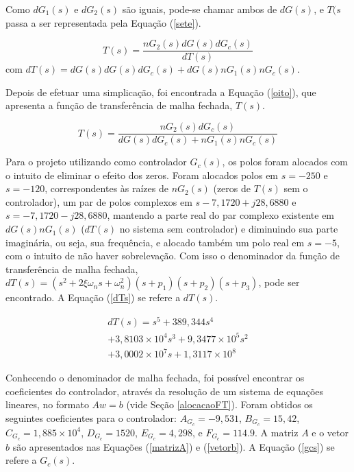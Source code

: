 \documentclass[journal,brazil,english]{IEEEtran}
\begin{document}

Como $dG_1(s)$ e $dG_2(s)$ são iguais, pode-se chamar ambos de $dG(s)$, e $T(s$ passa a ser representada pela Equação (\ref{sete}).

\begin{equation}\label{sete}
T(s) = \frac{nG_2(s)dG(s)dG_c(s)}{dT(s)}
\end{equation}
com $dT(s)=dG(s)dG(s)dG_c(s)+dG(s)nG_1(s)nG_c(s)$.

Depois de efetuar uma simplicação, foi encontrada a Equação (\ref{oito}), que apresenta a função de transferência de malha fechada, $T(s)$.

\begin{equation}\label{oito}
T(s)=\frac{nG_2(s)dG_c(s)}{dG(s)dG_c(s)+nG_1(s)nG_c(s)}
\end{equation}

Para o projeto utilizando como controlador $G_c(s)$, os polos foram alocados com o intuito de eliminar o efeito dos zeros. Foram alocados polos em $s = -250$ e $s = -120$, correspondentes às raízes de $nG_2(s)$ (zeros de $T(s)$ sem o controlador), um par de polos complexos em $s -7,1720+j28,6880$ e $s = -7,1720-j28,6880$, mantendo a parte real do par complexo existente em $dG(s)nG_1(s)$ ($dT(s)$ no sistema sem controlador) e diminuindo sua parte imaginária, ou seja, sua frequência, e alocado também um polo real em $s = -5$, com o intuito de não haver sobrelevação. Com isso o denominador da função de transferência de malha fechada, $dT(s) = (s^2+2\xi \omega_n s+ \omega_n^2)(s+p_1)(s+p_2)(s+p_3)$, pode ser encontrado. A Equação (\ref{dTs}) se refere a $dT(s)$.

\begin{equation}\label{dTs}
\begin{matrix}
dT(s)=s^5+389,344s^4\\+3,8103\times10^4s^3+9,3477\times10^5s^2\\+3,0002\times10^7s+1,3117\times10^8
\end{matrix}
\end{equation}

Conhecendo o denominador de malha fechada, foi possível encontrar os coeficientes do controlador, através da resolução de um sistema de equações lineares, no formato $Aw=b$ (vide Seção \ref{alocacaoFT}). Foram obtidos os seguintes coeficientes para o controlador: $A_{G_c} = -9,531$, $B_{G_c} = 15,42$, $C_{G_c} = 1,885\times10^4$, $D_{G_c} = 1520$, $E_{G_c} = 4,298$, e $F_{G_c} = 114.9$. A matriz $A$ e o vetor $b$ são apresentados nas Equações (\ref{matrizA}) e (\ref{vetorb}). A Equação (\ref{gcs}) se refere a $G_c(s)$.
\end{document}
